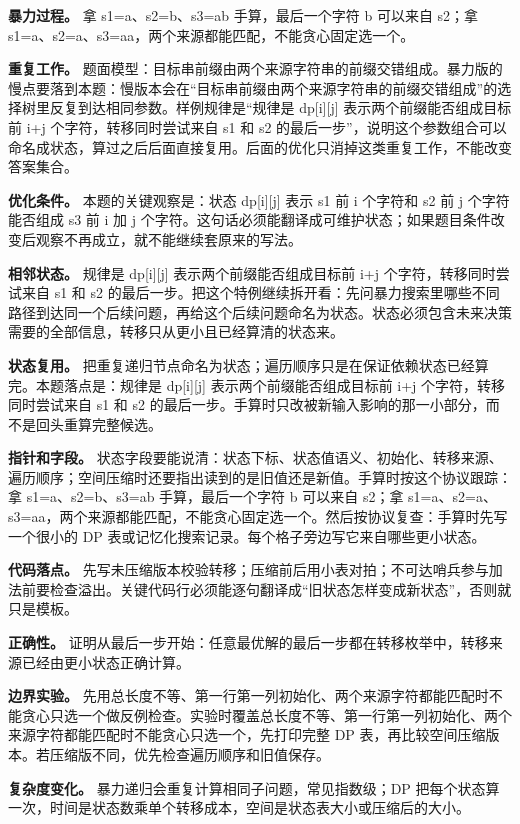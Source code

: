 \textbf{暴力过程。} 拿 s1=a、s2=b、s3=ab 手算，最后一个字符 b 可以来自 s2；拿 s1=a、s2=a、s3=aa，两个来源都能匹配，不能贪心固定选一个。

\textbf{重复工作。} 题面模型：目标串前缀由两个来源字符串的前缀交错组成。暴力版的慢点要落到本题：慢版本会在“目标串前缀由两个来源字符串的前缀交错组成”的选择树里反复到达相同参数。样例规律是“规律是 dp[i][j] 表示两个前缀能否组成目标前 i+j 个字符，转移同时尝试来自 s1 和 s2 的最后一步”，说明这个参数组合可以命名成状态，算过之后后面直接复用。后面的优化只消掉这类重复工作，不能改变答案集合。

\textbf{优化条件。} 本题的关键观察是：状态 dp[i][j] 表示 s1 前 i 个字符和 s2 前 j 个字符能否组成 s3 前 i 加 j 个字符。这句话必须能翻译成可维护状态；如果题目条件改变后观察不再成立，就不能继续套原来的写法。

\textbf{相邻状态。} 规律是 dp[i][j] 表示两个前缀能否组成目标前 i+j 个字符，转移同时尝试来自 s1 和 s2 的最后一步。把这个特例继续拆开看：先问暴力搜索里哪些不同路径到达同一个后续问题，再给这个后续问题命名为状态。状态必须包含未来决策需要的全部信息，转移只从更小且已经算清的状态来。

\textbf{状态复用。} 把重复递归节点命名为状态；遍历顺序只是在保证依赖状态已经算完。本题落点是：规律是 dp[i][j] 表示两个前缀能否组成目标前 i+j 个字符，转移同时尝试来自 s1 和 s2 的最后一步。手算时只改被新输入影响的那一小部分，而不是回头重算完整候选。

\textbf{指针和字段。} 状态字段要能说清：状态下标、状态值语义、初始化、转移来源、遍历顺序；空间压缩时还要指出读到的是旧值还是新值。手算时按这个协议跟踪：拿 s1=a、s2=b、s3=ab 手算，最后一个字符 b 可以来自 s2；拿 s1=a、s2=a、s3=aa，两个来源都能匹配，不能贪心固定选一个。然后按协议复查：手算时先写一个很小的 DP 表或记忆化搜索记录。每个格子旁边写它来自哪些更小状态。

\textbf{代码落点。} 先写未压缩版本校验转移；压缩前后用小表对拍；不可达哨兵参与加法前要检查溢出。关键代码行必须能逐句翻译成“旧状态怎样变成新状态”，否则就只是模板。

\textbf{正确性。} 证明从最后一步开始：任意最优解的最后一步都在转移枚举中，转移来源已经由更小状态正确计算。

\textbf{边界实验。} 先用总长度不等、第一行第一列初始化、两个来源字符都能匹配时不能贪心只选一个做反例检查。实验时覆盖总长度不等、第一行第一列初始化、两个来源字符都能匹配时不能贪心只选一个，先打印完整 DP 表，再比较空间压缩版本。若压缩版不同，优先检查遍历顺序和旧值保存。

\textbf{复杂度变化。} 暴力递归会重复计算相同子问题，常见指数级；DP 把每个状态算一次，时间是状态数乘单个转移成本，空间是状态表大小或压缩后的大小。

